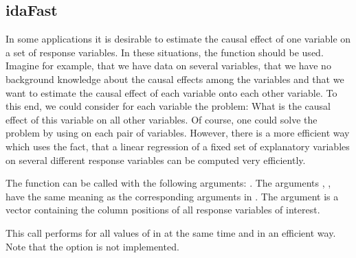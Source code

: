 \documentclass[article]{jss}
\begin{document}
\subsection{idaFast}
In some applications it is desirable to estimate the causal effect of one
variable on a set of response variables. In these situations, the function
 should be used. Imagine for example, that we have data
on several variables, that we have no background knowledge about the causal
effects among the variables and that we want to estimate the causal effect of
each variable onto each other variable. To this end, we could consider for
each variable the problem: What is the causal effect of this variable on
all other variables. Of course, one could solve the problem by using  on
each pair of variables. However, there is a more efficient way which uses
the fact, that a linear regression of a fixed set of explanatory variables
on several different response variables can be computed very efficiently.

The function  can be called with the following arguments:
. The arguments
, ,  have the same meaning as
the corresponding arguments in . The argument 
is a vector containing the column positions of all response variables of
interest.

This call performs  for all values of  in
 at the same time and in an efficient way. Note that the
option  is not implemented.
\end{document}
